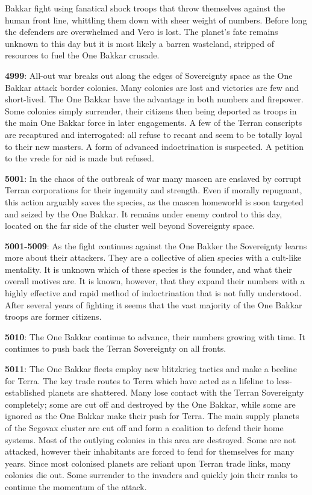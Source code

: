 Bakkar fight using fanatical shock troops that throw themselves against the human front line, whittling them down with sheer weight of numbers. Before long the defenders are overwhelmed and Vero is lost. The planet's fate remains unknown to this day but it is most likely a barren wasteland, stripped of resources to fuel the One Bakkar crusade.

\textbf{4999}: All-out war breaks out along the edges of Sovereignty space as the One Bakkar attack border colonies. Many colonies are lost and victories are few and short-lived. The One Bakkar have the advantage in both numbers and firepower. Some colonies simply surrender, their citizens then being deported as troops in the main One Bakkar force in later engagements. A few of the Terran conscripts are recaptured and interrogated: all refuse to recant and seem to be totally loyal to their new masters. A form of advanced indoctrination is suspected. A petition to the vrede for aid is made but refused.

\textbf{5001}: In the chaos of the outbreak of war many mascen are enslaved by corrupt Terran corporations for their ingenuity and strength. Even if morally repugnant, this action arguably saves the species, as the mascen homeworld is soon targeted and seized by the One Bakkar. It remains under enemy control to this day, located on the far side of the cluster well beyond Sovereignty space.

\textbf{5001-5009}: As the fight continues against the One Bakker the Sovereignty learns more about their attackers. They are a collective of alien species with a cult-like mentality. It is unknown which of these species is the founder, and what their overall motives are. It is known, however, that they expand their numbers with a highly effective and rapid method of indoctrination that is not fully understood. After several years of fighting it seems that the vast majority of the One Bakkar troops are former citizens.

\textbf{5010}: The One Bakkar continue to advance, their numbers growing with time. It continues to push back the Terran Sovereignty on all fronts.

\textbf{5011}: The One Bakkar fleets employ new blitzkrieg tactics and make a beeline for Terra. The key trade routes to Terra which have acted as a lifeline to less-established planets are shattered. Many lose contact with the Terran Sovereignty completely; some are cut off and destroyed by the One Bakkar, while some are ignored as the One Bakkar make their push for Terra. The main supply planets of the Segovax cluster are cut off and form a coalition to defend their home systems. Most of the outlying colonies in this area are destroyed. Some are not attacked, however their inhabitants are forced to fend for themselves for many years. Since most colonised planets are reliant upon Terran trade links, many colonies die out. Some surrender to the invaders and quickly join their ranks to continue the momentum of the attack.

